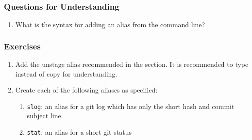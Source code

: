 \subsubsection{Questions for Understanding}
\begin{enumerate}
	\item What is the syntax for adding an alias from the command line?
\end{enumerate}

\subsubsection{Exercises}
\begin{enumerate}
	\item Add the unstage alias recommended in the section.
	   It is recommended to type instead of copy for understanding.
	\item Create each of the following aliases as specified:
	\begin{enumerate}
	   \item \verb`slog`: an alias for a git log which has only the short hash and 
		  commit subject line.
	   \item \verb`stat`: an alias for a short git status
	\end{enumerate}
\end{enumerate}

